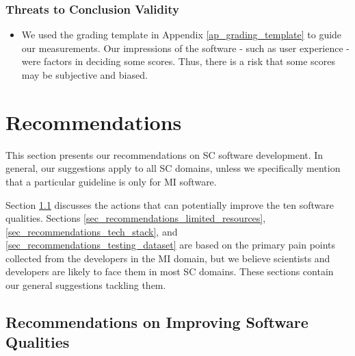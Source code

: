 \documentclass[3p, 12pt,authoryear]{elsarticle}
\begin{document}
\subsubsection{Threats to Conclusion Validity}
\begin{itemize}
\item We used the grading template in Appendix \ref{ap_grading_template} to
guide our measurements. Our impressions of the software - such as user
experience - were factors in deciding some scores. Thus, there is a risk that
some scores may be subjective and biased.
\end{itemize}

\section{Recommendations} \label{ch_recommendations}

This section presents our recommendations on SC software development. In
general, our suggestions apply to all SC domains, unless we specifically mention
that a particular guideline is only for MI software.

Section \ref{sec_recommendations_qualities} discusses the actions that can
potentially improve the ten software qualities. Sections
\ref{sec_recommendations_limited_resources},
\ref{sec_recommendations_tech_stack}, and
\ref{sec_recommendations_testing_dataset} are based on the primary pain points
collected from the developers in the MI domain, but we believe scientists and
developers are likely to face them in most SC domains. These sections contain
our general suggestions tackling them. 

\subsection{Recommendations on Improving Software Qualities} \label{sec_recommendations_qualities}
\end{document}

